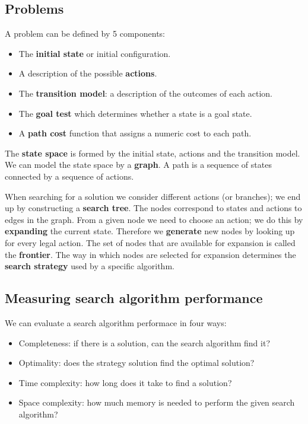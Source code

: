 \documentclass[a4paper, 11pt]{article}
\begin{document}
\subsection*{Problems}
A problem can be defined by 5 components:
\begin{itemize}
  \item The \textbf{initial state} or initial configuration.
  \item A description of the possible \textbf{actions}.
  \item The \textbf{transition model}: a description of the outcomes of each action.
  \item The \textbf{goal test} which determines whether a state is a goal state.
  \item A \textbf{path cost} function that assigns a numeric cost to each path.
\end{itemize}
The \textbf{state space} is formed by the initial state, actions and the transition model. We can model the state space by a \textbf{graph}.
A path is a sequence of states connected by a sequence of actions.

When searching for a solution we consider different actions (or branches); we end up by constructing a \textbf{search tree}.
The nodes correspond to states and actions to edges in the graph. From a given node we need to choose an action; we do this by \textbf{expanding} the current state. Therefore we \textbf{generate} new nodes by looking up for every legal action.
The set of nodes that are available for expansion is called the \textbf{frontier}. The way in which nodes are selected for expansion determines the \textbf{search strategy} used by a specific algorithm.

\subsection*{Measuring search algorithm performance}
We can evaluate a search algorithm performace in four ways:
\begin{itemize}
  \item Completeness: if there is a solution, can the search algorithm find it?
  \item Optimality: does the strategy solution find the optimal solution?
  \item Time complexity: how long does it take to find a solution?
  \item Space complexity: how much memory is needed to perform the given search algorithm?
\end{itemize}
\end{document}
